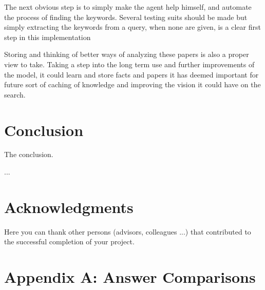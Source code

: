 \documentclass[fleqn,moreauthors,10pt]{ds_report}
\begin{document}
The next obvious step is to simply make the agent help himself, and automate the process of finding the keywords. Several testing suits should be made but simply extracting the keywords from a query, when none are given, is a clear first step in this implementation

Storing and thinking of better ways of analyzing these papers is also a proper view to take. Taking a step into the long term use and further improvements of the model, it could learn and store facts and papers it has deemed important for future sort of caching of knowledge and improving the vision it could have on the search.




\section*{Conclusion}
The conclusion.

...


\section*{Acknowledgments}

Here you can thank other persons (advisors, colleagues ...) that contributed to the successful completion of your project.






\clearpage


\appendix
\appendix
\section*{Appendix A: Answer Comparisons}
\end{document}
